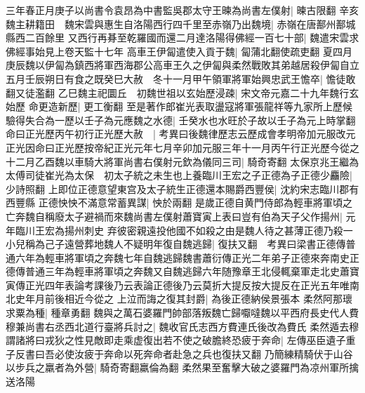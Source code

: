 三年春正月庚子以尚書令袁昂為中書監吳郡太守王暕為尚書左僕射|{
	暕古限翻}
辛亥魏主耕籍田　魏宋雲與惠生自洛陽西行四千里至赤嶺乃出魏境|{
	赤嶺在唐鄯州鄯城縣西二百餘里}
又西行再朞至乾羅國而還二月達洛陽得佛經一百七十部|{
	魏遣宋雲求佛經事始見上卷天監十七年}
高車王伊匐遣使入貢于魏|{
	匐蒲北翻使疏吏翻}
夏四月庚辰魏以伊匐為鎮西將軍西海郡公高車王久之伊匐與柔然戰敗其弟越居殺伊匐自立　五月壬辰朔日有食之既癸巳大赦　冬十一月甲午領軍將軍始興忠武王憺卒|{
	憺徒敢翻又徒濫翻}
乙巳魏主祀圜丘　初魏世祖以玄始歷浸疎|{
	宋文帝元嘉二十九年魏行玄始歷}
命更造新歷|{
	更工衡翻}
至是著作郎崔光表取盪寇將軍張龍祥等九家所上歷候驗得失合為一歷以壬子為元應魏之水德|{
	壬癸水也水旺於子故以壬子為元上時掌翻}
命曰正光歷丙午初行正光歷大赦　|{
	考異曰後魏律歷志云歷成會孝明帝加元服改元正光因命曰正光歷按帝紀正光元年七月辛卯加元服三年十一月丙午行正光歷今從之}
十二月乙酉魏以車騎大將軍尚書右僕射元欽為儀同三司|{
	騎奇寄翻}
太保京兆王繼為太傅司徒崔光為太保　初太子統之未生也上養臨川王宏之子正德為子正德少麤險|{
	少詩照翻}
上即位正德意望東宫及太子統生正德還本賜爵西豐侯|{
	沈約宋志臨川郡有西豐縣}
正德怏怏不滿意常蓄異謀|{
	怏於兩翻}
是歲正德自黄門侍郎為輕車將軍頃之亡奔魏自稱廢太子避禍而來魏尚書左僕射蕭寶寅上表曰豈有伯為天子父作揚州|{
	元年臨川王宏為揚州刺史}
弃彼密親遠投他國不如殺之由是魏人待之甚薄正德乃殺一小兒稱為己子遠營葬地魏人不疑明年復自魏逃歸|{
	復扶又翻　考異曰梁書正德傳普通六年為輕車將軍頃之奔魏七年自魏逃歸魏書蕭衍傳正光二年弟子正德來奔南史正德傳普通三年為輕車將軍頃之奔魏又自魏逃歸六年随豫章王北侵輒棄軍走北史蕭寶寅傳正光四年表論考課後乃云表論正德後乃云莫折大提反按大提反在正光五年唯南北史年月前後相近今從之}
上泣而誨之復其封爵|{
	為後正德納侯景張本}
柔然阿那瓌求粟為種|{
	種章勇翻}
魏與之萬石婆羅門帥部落叛魏亡歸嚈噠魏以平西府長史代人費穆兼尚書右丞西北道行臺將兵討之|{
	魏收官氏志西方費連氏後改為費氏}
柔然遁去穆謂諸將曰戎狄之性見敵即走乘虚復出若不使之破膽終恐疲于奔命|{
	左傳巫臣遺子重子反書曰吾必使汝疲于奔命以死奔命者赴急之兵也復扶又翻}
乃簡練精騎伏于山谷以步兵之羸者為外營|{
	騎奇寄翻羸倫為翻}
柔然果至奮擊大破之婆羅門為凉州軍所擒送洛陽

